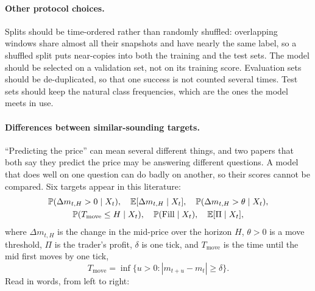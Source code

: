 \paragraph{Other protocol choices.} Splits should be time-ordered rather than randomly shuffled: overlapping
windows share almost all their snapshots and have nearly the same label, so a shuffled split puts near-copies into
both the training and the test sets. The model should be selected on a validation set, not on its training score.
Evaluation sets should be de-duplicated, so that one success is not counted several times. Test sets should keep
the natural class frequencies, which are the ones the model meets in use.
\paragraph{Differences between similar-sounding targets.} ``Predicting the price'' can mean several different
things, and two papers that both say they predict the price may be answering different questions. A model that does
well on one question can do badly on another, so their scores cannot be compared. Six targets appear in this
literature:
\begin{equation}
  \begin{gathered}
  \mathbb{P}(\Delta m_{t,H} > 0 \mid X_t),\quad \mathbb{E}[\Delta m_{t,H} \mid X_t],\quad
  \mathbb{P}(\Delta m_{t,H} > \theta \mid X_t),\\
  \mathbb{P}(T_{\text{move}} \le H \mid X_t),\quad \mathbb{P}(\mathrm{Fill} \mid X_t),\quad \mathbb{E}[\Pi \mid X_t],
  \end{gathered}
\label{eq:six-targets}
\end{equation}
where $\Delta m_{t,H}$ is the change in the mid-price over the horizon $H$, $\theta > 0$ is a move threshold,
$\Pi$ is the trader's profit, $\delta$ is one tick, and $T_{\text{move}}$ is the time until the mid first moves by one
tick,
\[
  T_{\text{move}} = \inf\{u > 0 : |m_{t+u} - m_t| \ge \delta\}.
\]
Read in words, from left to right:
